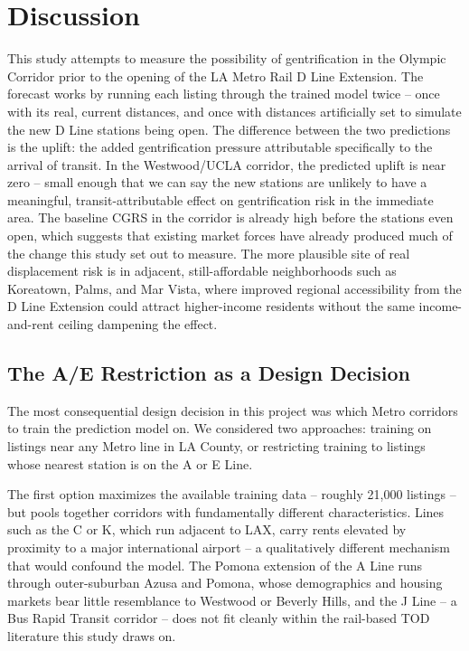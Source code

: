 \documentclass[11pt]{article}
\begin{document}
\section{Discussion}

This study attempts to measure the possibility of gentrification in the Olympic Corridor prior to the opening of the LA Metro Rail D Line Extension. The forecast works by running each listing through the trained model twice -- once with its real, current distances, and once with distances artificially set to simulate the new D Line stations being open. The difference between the two predictions is the uplift: the added gentrification pressure attributable specifically to the arrival of transit. In the Westwood/UCLA corridor, the predicted uplift is near zero -- small enough that we can say the new stations are unlikely to have a meaningful, transit-attributable effect on gentrification risk in the immediate area. The baseline CGRS in the corridor is already high before the stations even open, which suggests that existing market forces have already produced much of the change this study set out to measure. The more plausible site of real displacement risk is in adjacent, still-affordable neighborhoods such as Koreatown, Palms, and Mar Vista, where improved regional accessibility from the D Line Extension could attract higher-income residents without the same income-and-rent ceiling dampening the effect.

\subsection{The A/E Restriction as a Design Decision}

The most consequential design decision in this project was which Metro corridors to train the prediction model on. We considered two approaches: training on listings near any Metro line in LA County, or restricting training to listings whose nearest station is on the A or E Line.

The first option maximizes the available training data -- roughly 21,000 listings -- but pools together corridors with fundamentally different characteristics. Lines such as the C or K, which run adjacent to LAX, carry rents elevated by proximity to a major international airport -- a qualitatively different mechanism that would confound the model. The Pomona extension of the A Line runs through outer-suburban Azusa and Pomona, whose demographics and housing markets bear little resemblance to Westwood or Beverly Hills, and the J Line -- a Bus Rapid Transit corridor -- does not fit cleanly within the rail-based TOD literature this study draws on.
\end{document}
